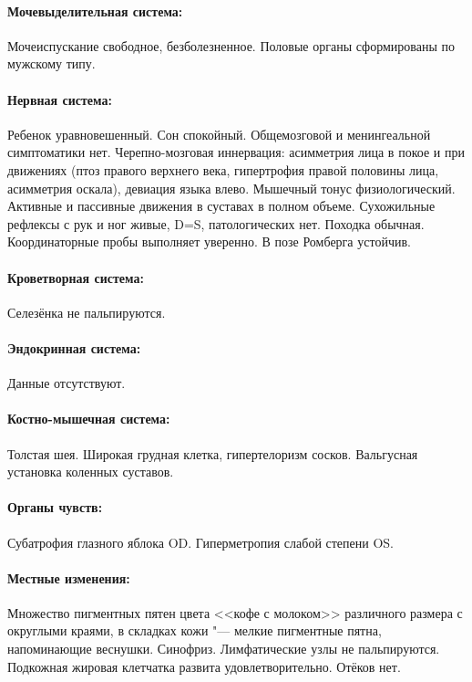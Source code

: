 \documentclass[a4paper,14pt]{extarticle}
\begin{document}
\paragraph{Мочевыделительная система:} Мочеиспускание свободное, безболезненное. Половые органы сформированы по мужскому типу.

\paragraph{Нервная система:} Ребенок уравновешенный. Сон спокойный. Общемозговой и менингеальной симптоматики нет. Черепно\hyp{}мозговая иннервация: асимметрия лица в покое и при движениях (птоз правого верхнего века, гипертрофия правой половины лица, асимметрия оскала), девиация языка влево. Мышечный тонус физиологический. Активные и пассивные движения в суставах в полном объеме. Сухожильные рефлексы с рук и ног живые, D=S, патологических нет. Походка обычная. Координаторные пробы выполняет уверенно. В позе Ромберга устойчив. 

\paragraph{Кроветворная система:} Селезёнка не пальпируются.

\paragraph{Эндокринная система:} Данные отсутствуют.

\paragraph{Костно-мышечная система:} Толстая шея. Широкая грудная клетка, гипертелоризм сосков. Вальгусная установка коленных суставов. 

\paragraph{Органы чувств:} Субатрофия глазного яблока OD. Гиперметропия слабой степени OS.

\paragraph{Местные изменения:} Множество пигментных пятен цвета <<кофе с молоком>> различного размера с округлыми краями, в складках кожи "--- мелкие пигментные пятна, напоминающие веснушки. Синофриз. Лимфатические узлы не пальпируются. Подкожная жировая клетчатка развита удовлетворительно. Отёков нет.
\end{document}
